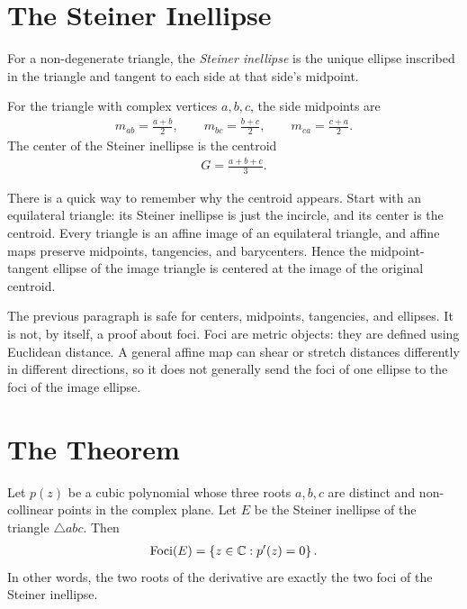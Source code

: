 \documentclass[11pt]{article}
\DeclareMathOperator{\Foci}{Foci}
\begin{document}
\section{The Steiner Inellipse}

\begin{definitionbox}[title=Steiner inellipse]
For a non-degenerate triangle, the \emph{Steiner inellipse} is the unique ellipse inscribed in the triangle and tangent to each side at that side's midpoint.
\end{definitionbox}

For the triangle with complex vertices \(a,b,c\), the side midpoints are
\begin{align}
  m_{ab}=\frac{a+b}{2},
  \qquad
  m_{bc}=\frac{b+c}{2},
  \qquad
  m_{ca}=\frac{c+a}{2}.
\end{align}
The center of the Steiner inellipse is the centroid
\begin{align}
  G=\frac{a+b+c}{3}.
  \label{eq:centroid}
\end{align}

There is a quick way to remember why the centroid appears. Start with an equilateral triangle: its Steiner inellipse is just the incircle, and its center is the centroid. Every triangle is an affine image of an equilateral triangle, and affine maps preserve midpoints, tangencies, and barycenters. Hence the midpoint-tangent ellipse of the image triangle is centered at the image of the original centroid.

\begin{warningbox}[title=Affine warning]
The previous paragraph is safe for centers, midpoints, tangencies, and ellipses. It is not, by itself, a proof about foci. Foci are metric objects: they are defined using Euclidean distance. A general affine map can shear or stretch distances differently in different directions, so it does not generally send the foci of one ellipse to the foci of the image ellipse.
\end{warningbox}

\section{The Theorem}

\begin{theorem}
\label{thm:marden}
Let \(p(z)\) be a cubic polynomial whose three roots \(a,b,c\) are distinct and non-collinear points in the complex plane. Let \(E\) be the Steiner inellipse of the triangle \(\triangle abc\). Then
\begin{align}
  \Foci(E)=\set{z\in\C:p'(z)=0}.
\end{align}
In other words, the two roots of the derivative are exactly the two foci of the Steiner inellipse.
\end{theorem}
\end{document}
